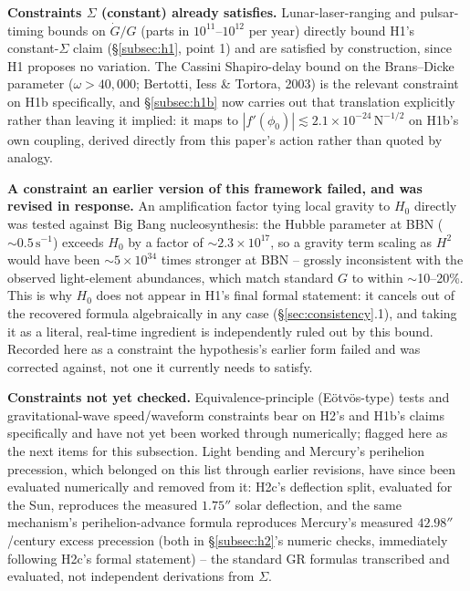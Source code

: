 \documentclass[12pt, a4paper]{article}
\begin{document}
\textbf{Constraints $\Sigma$ (constant) already satisfies.}
Lunar-laser-ranging and pulsar-timing bounds on $\dot G/G$ (parts in
$10^{11}$--$10^{12}$ per year) directly bound H1's constant-$\Sigma$
claim (\S\ref{subsec:h1}, point 1) and are satisfied by construction,
since H1 proposes no variation. The Cassini Shapiro-delay bound on
the Brans--Dicke parameter ($\omega>40{,}000$; Bertotti, Iess \&
Tortora, 2003) is the relevant constraint on H1b specifically, and
\S\ref{subsec:h1b} now carries out that translation explicitly rather
than leaving it implied: it maps to
$|f'(\phi_0)|\lesssim2.1\times10^{-24}\,\mathrm{N}^{-1/2}$ on H1b's
own coupling, derived directly from this paper's action rather than
quoted by analogy.

\textbf{A constraint an earlier version of this framework failed, and
was revised in response.} An amplification factor tying local gravity
to $H_0$ directly was tested against Big Bang nucleosynthesis: the
Hubble parameter at BBN ($\sim0.5\,\mathrm{s^{-1}}$) exceeds $H_0$ by
a factor of $\sim2.3\times10^{17}$, so a gravity term scaling as
$H^2$ would have been $\sim5\times10^{34}$ times stronger at BBN --
grossly inconsistent with the observed light-element abundances, which
match standard $G$ to within $\sim$10--20\%. This is why $H_0$ does
not appear in H1's final formal statement: it cancels out of the
recovered formula algebraically in any case
(\S\ref{sec:consistency}.1), and taking it as a literal, real-time
ingredient is independently ruled out by this bound. Recorded here as
a constraint the hypothesis's earlier form failed and was corrected
against, not one it currently needs to satisfy.

\textbf{Constraints not yet checked.} Equivalence-principle
(E\"otv\"os-type) tests and gravitational-wave speed/waveform
constraints bear on H2's and H1b's claims specifically and have not
yet been worked through numerically; flagged here as the next items
for this subsection. Light bending and Mercury's perihelion
precession, which belonged on this list through earlier revisions,
have since been evaluated numerically and removed from it: H2c's
deflection split, evaluated for the Sun, reproduces the measured
$1.75''$ solar deflection, and the same mechanism's perihelion-advance
formula reproduces Mercury's measured $42.98''$/century excess
precession (both in \S\ref{subsec:h2}'s numeric checks, immediately
following H2c's formal statement) -- the standard GR formulas
transcribed and evaluated, not independent derivations from
$\Sigma$.
\end{document}
